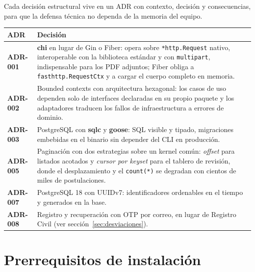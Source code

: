 \documentclass[11pt,a4paper]{article}
\newcommand{\ent}[1]{\textsf{\textbf{#1}}}
\newcommand{\code}[1]{\texttt{#1}}
\begin{document}
Cada decisi\'on estructural vive en un ADR con contexto, decisi\'on y consecuencias, para que la
defensa t\'ecnica no dependa de la memoria del equipo.

\begin{center}
\small
\begin{tabularx}{\textwidth}{@{}>{\bfseries\color{upseAzul}}l X@{}}
\toprule
ADR & Decisi\'on \\
\midrule
ADR-001 & \ent{chi} en lugar de Gin o Fiber: opera sobre \code{*http.Request} nativo, interoperable con
la biblioteca est\'andar y con \code{multipart}, indispensable para los PDF adjuntos; Fiber obliga a
\code{fasthttp.RequestCtx} y a cargar el cuerpo completo en memoria. \\
ADR-002 & Bounded contexts con arquitectura hexagonal: los casos de uso dependen solo de interfaces
declaradas en su propio paquete y los adaptadores traducen los fallos de infraestructura a errores de
dominio. \\
ADR-003 & PostgreSQL con \ent{sqlc} y \ent{goose}: SQL visible y tipado, migraciones embebidas en el
binario sin depender del CLI en producci\'on. \\
ADR-005 & Paginaci\'on con dos estrategias sobre un kernel com\'un: \emph{offset} para listados
acotados y \emph{cursor por keyset} para el tablero de revisi\'on, donde el desplazamiento y el
\code{count(*)} se degradan con cientos de miles de postulaciones. \\
ADR-007 & PostgreSQL 18 con UUIDv7: identificadores ordenables en el tiempo y generados en la base. \\
ADR-008 & Registro y recuperaci\'on con OTP por correo, en lugar de Registro Civil (ver
secci\'on~\ref{sec:desviaciones}). \\
\bottomrule
\end{tabularx}
\end{center}

\section{Prerrequisitos de instalaci\'on}
\end{document}
